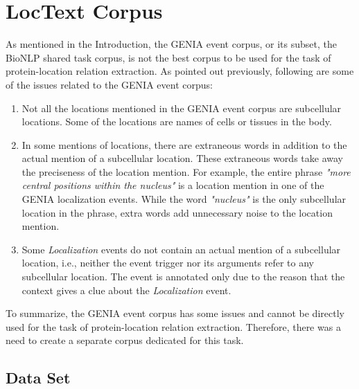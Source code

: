 \chapter{LocText Corpus}\label{chapter:corpus}


As mentioned in the Introduction, the GENIA event corpus, or its subset, the BioNLP shared task corpus, is not the best corpus to be used for the task of protein-location relation extraction. As pointed out previously, following are some of the issues related to the GENIA event corpus:

\begin{enumerate}

\item Not all the locations mentioned in the GENIA event corpus are subcellular locations. Some of the locations are names of cells or tissues in the body.

\item In some mentions of locations, there are extraneous words in addition to the actual mention of a subcellular location. These extraneous words take away the preciseness of the location mention. For example, the entire phrase \textit{"more central positions within the nucleus"} is a location mention in one of the GENIA localization events. While the word \textit{"nucleus"} is the only subcellular location in the phrase, extra words add unnecessary noise to the location mention.

\item Some \textit{Localization} events do not contain an actual mention of a subcellular location, i.e., neither the event trigger nor its arguments refer to any subcellular location. The event is annotated only due to the reason that the context gives a clue about the \textit{Localization} event.

\end{enumerate}

To summarize, the GENIA event corpus has some issues and cannot be directly used for the task of protein-location relation extraction. Therefore, there was a need to create a separate corpus dedicated for this task.

\section{Data Set}\label{sec:LocTextCorpus}

